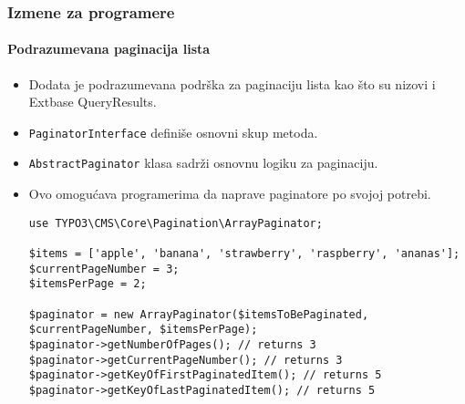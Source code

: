 
\begin{frame}[fragile]
	\frametitle{Izmene za programere}
	\framesubtitle{Podrazumevana paginacija lista}

	\lstset{basicstyle=\tiny\ttfamily}

	\begin{itemize}
		\item Dodata je podrazumevana podrška za paginaciju lista kao što su nizovi i Extbase QueryResults.
		\item \texttt{PaginatorInterface} definiše osnovni skup metoda.
		\item \texttt{AbstractPaginator} klasa sadrži osnovnu logiku za paginaciju.
		\item Ovo omogućava programerima da naprave paginatore po svojoj potrebi.
\begin{lstlisting}
use TYPO3\CMS\Core\Pagination\ArrayPaginator;

$items = ['apple', 'banana', 'strawberry', 'raspberry', 'ananas'];
$currentPageNumber = 3;
$itemsPerPage = 2;

$paginator = new ArrayPaginator($itemsToBePaginated, $currentPageNumber, $itemsPerPage);
$paginator->getNumberOfPages(); // returns 3
$paginator->getCurrentPageNumber(); // returns 3
$paginator->getKeyOfFirstPaginatedItem(); // returns 5
$paginator->getKeyOfLastPaginatedItem(); // returns 5
\end{lstlisting}

	\end{itemize}

\end{frame}


